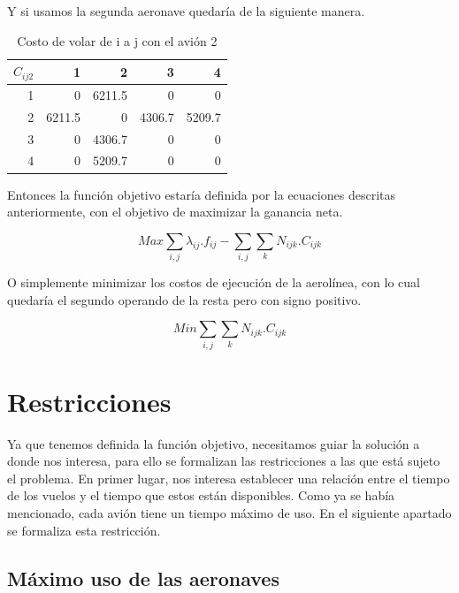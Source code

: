 \documentclass[12pt]{article}
\begin{document}
Y si usamos la segunda aeronave quedaría de la siguiente manera. 

\begin{table}[ht!]
    \centering
    \begin{tabular}{r|r|r|r|r}
        $C_{ij2}$%
               &   1  &   2  &   3  &   4\\
            \hline
            \hline
              1 &      0  & 6211.5  &      0  &      0\\
              2 & 6211.5  &      0  & 4306.7  & 5209.7\\
              3 &      0  & 4306.7  &      0  &      0\\
              4 &      0  & 5209.7  &      0  &      0\\
    \end{tabular}
    \caption{Costo de volar de i a j con el avión 2}
    \label{tab:cij2}
\end{table}

Entonces la función objetivo estaría definida por la ecuaciones descritas anteriormente, con el objetivo de maximizar la ganancia neta.

\begin{equation}
    Max \sum_{i,j} \lambda_{ij}.f_{ij} - \sum_{i,j}\sum_{k} N_{ijk}.C_{ijk}
\end{equation}

O simplemente minimizar los costos de ejecución de la aerolínea, con lo cual quedaría el segundo operando de la resta pero con signo positivo.

\begin{equation}
    Min \sum_{i,j}\sum_{k} N_{ijk}.C_{ijk}
\end{equation}

\section{Restricciones}

Ya que tenemos definida la función objetivo, necesitamos guiar la solución a donde nos interesa, para ello se formalizan las restricciones a las que está sujeto el problema. En primer lugar, nos interesa establecer una relación entre el tiempo de los vuelos y el tiempo que estos están disponibles. Como ya se había mencionado, cada avión tiene un tiempo máximo de uso. En el siguiente apartado se formaliza esta restricción.

\subsection{Máximo uso de las aeronaves}
\end{document}
